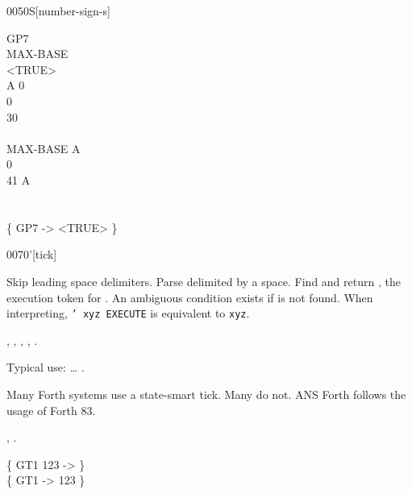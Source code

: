 \begin{worddef}[numS]{0050}{\num{}S}[number-sign-s]
\begin{defer}
		\word{:} GP7 \\
		\tab	{}  		MAX-BASE  \word{!} \\
		\tab	<TRUE> \\
		\tab	A 0  \\
		\tab[2]		 0    \\
		 \word{=}    30 \word{+} \word{=} \word{AND}  \\
		\tab	\word{LOOP} \\
		\tab	MAX-BASE A \word{DO} \\
		\tab[2]		 0   \word{num-end} \\
		 \word{=}   41  A \word{-} \word{+} \word{=}   \\
		\tab	{} \\
		\tab	{}  \word{!} \word{;} \\
		\{ GP7 -> <TRUE> \}
	\end{defer}
\end{worddef}


\begin{worddef}{0070}{'}[tick]
\item {}

	Skip leading space delimiters. Parse  delimited by
	a space. Find  and return , the execution
	token for . An ambiguous condition exists if
	 is not found. When interpreting,
	\texttt{' xyz EXECUTE} is equivalent to \texttt{xyz}.

\see {},
	,
	,
	,
	.

	\begin{defer}
	\rationale %
		Typical use: {\ldots}  .

		Many Forth systems use a state-smart tick. Many do not.
		ANS Forth follows the usage of Forth 83.

	\see {},
		.

	\testing
		\{ \word{:} GT1 123 \word{;} -> \} \\
		\{  GT1  -> 123 \}
	\end{defer}
\end{worddef}


